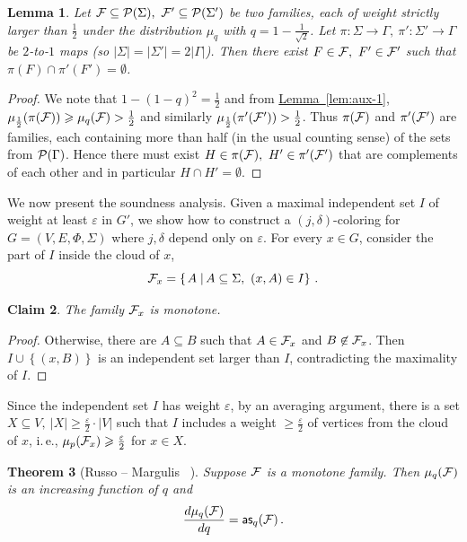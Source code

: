 \documentclass[11pt]{article}
\numberwithin{equation}{section}
\newtheorem{theorem}{Theorem}[section]
\newtheorem{lemma}[theorem]{Lemma}
\newtheorem{claim}[theorem]{Claim}
\theoremstyle{definition}
\theoremstyle{plain}
\newcommand{\ie}{i.\,e.}
\newcommand{\expref}[2]{\hyperref[#2]{#1~\ref{#2}}}
\newcommand\sett[2]{\left\{ \left. #1 \;\right\vert #2 \right\}}
\newcommand\set[1]{{\left\{ #1 \right\}}}
\newcommand\eps{\varepsilon}
\renewcommand\geq{\geqslant}
\begin{document}
\begin{lemma}\label{lem:aux-2}  Let ${\cal F}\subseteq {\cal P}(\Sigma), ~{\cal F}' \subseteq {\cal P}(\Sigma')$ be two families, each of weight strictly larger than
$\frac{1}{2}$ under the distribution $\mu_q$ with $q = 1-\frac{1}{\sqrt{2}}$. Let $\pi: \Sigma \to \Gamma, ~\pi': \Sigma' \to \Gamma$ be
$2$-to-$1$ maps (so $|\Sigma| = |\Sigma'| = 2|\Gamma|$).
Then there exist $F \in {\cal F},
~F' \in {\cal F}'$ such that $\pi(F) \cap \pi'(F') = \emptyset$.
\end{lemma}
\begin{proof} We note that $1-(1-q)^2 = \frac{1}{2}$ and from \expref{Lemma}{lem:aux-1}, $\mu_{\frac{1}{2}} (\pi({\cal F})) \geq \mu_q ({\cal F}) >
\frac{1}{2}$ and similarly $\mu_{\frac{1}{2}} (\pi'({\cal F}')) > \frac{1}{2}$. Thus $\pi({\cal F})$ and  $\pi'({\cal F}')$ are families,
each containing more than half (in the usual counting sense) of the sets from ${\cal P}(\Gamma)$. Hence there must exist $H \in \pi({\cal F}),
~H' \in \pi'({\cal F}')$ that are complements of each other and in particular $H \cap H' = \emptyset$.
\end{proof}



We now present the soundness analysis. Given
 a maximal independent set $I$ of weight at least $\eps$ in $G'$, we show how to construct
a $(j,\delta)$-coloring for $G=(V,E,\Phi,\Sigma)$ where $j,\delta$ depend only on $\eps$.
For every $x\in G$, consider the part of $I$ inside the cloud of $x$,
\[
{\cal F}_x=\sett{A}{A \subseteq \Sigma, ~(x,A)\in I}\,.%
\]
\begin{claim}
The family ${\cal F}_x$ is monotone.
\end{claim}
\begin{proof}
Otherwise, there are $A\subseteq B$ such that $A\in {\cal F}_x$ and $B\not\in{\cal F}_x$.
Then $I\cup\set{(x,B)}$ is an independent set larger than $I$,  contradicting  the maximality
of $I$.
\end{proof}

Since the independent set $I$ has weight $\eps$, by an averaging argument, there is a set
$X \subseteq V, ~|X| \geqslant \frac{\eps}{2} \cdot |V|$ such that $I$ includes a weight
$\geqslant \frac{\eps}{2}$ of vertices from the cloud of $x$, \ie, $\mu_p({\cal F}_x) \geqslant  \frac{\eps}{2}$
for $x \in X$.



\begin{theorem}[Russo -- Margulis ~\cite{Russo1982,Marg74}]
Suppose ${\cal F}$ is a monotone family. Then $\mu_q({\cal F})$ is an increasing function of $q$ and
\[
\frac{d\mu_q({\cal F})}{dq}={\sf as}_q({\cal F})\,.%
\]
\end{theorem}
\end{document}
